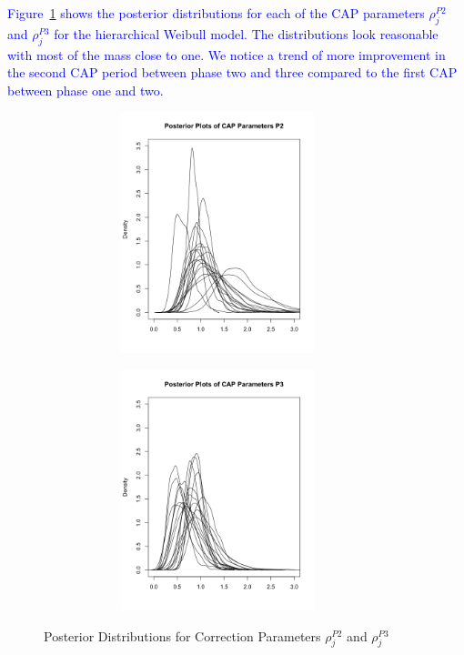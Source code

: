\documentclass[12pt]{article}
\begin{document}
\textcolor{blue}{Figure~\ref{fig:CAP} shows the posterior distributions for each of the CAP parameters $\rho_{j}^{P2}$ and $\rho_{j}^{P3}$ for the hierarchical Weibull model.  The distributions look reasonable with most of the mass close to one.  We notice a trend of more improvement in the second CAP period between phase two and three compared to the first CAP between phase one and two.}
\begin{figure}[ht]
\centering
\begin{subfigure}{.5\textwidth}
  \centering
      \includegraphics[width=8cm, height=7cm]{CAP2}
\end{subfigure}%
\begin{subfigure}{.5\textwidth}
  \center
  	\includegraphics[width=8cm, height=7cm]{CAP3}
\end{subfigure}
\caption{Posterior Distributions for Correction Parameters $\rho_{j}^{P2}$ and $\rho_{j}^{P3}$}
\label{fig:CAP}
\end{figure}
\end{document}
